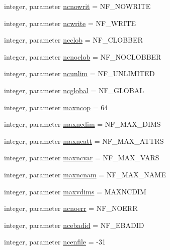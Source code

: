 \begin{DoxyCompactItemize}
\item 
integer, parameter \hyperlink{namespacenetcdf__nf__data_ad1e0a536032a056da8a53764f01f2a30}{ncnowrit} = N\+F\+\_\+\+N\+O\+W\+R\+I\+TE
\item 
integer, parameter \hyperlink{namespacenetcdf__nf__data_a8531d390a08862ce18bcb314168801cc}{ncwrite} = N\+F\+\_\+\+W\+R\+I\+TE
\item 
integer, parameter \hyperlink{namespacenetcdf__nf__data_a390b90425185669675d58dd9166deea1}{ncclob} = N\+F\+\_\+\+C\+L\+O\+B\+B\+ER
\item 
integer, parameter \hyperlink{namespacenetcdf__nf__data_af61770c9009f96909807d8a86849a191}{ncnoclob} = N\+F\+\_\+\+N\+O\+C\+L\+O\+B\+B\+ER
\item 
integer, parameter \hyperlink{namespacenetcdf__nf__data_af5632bf38434d6b35a1ffe750a5a74ec}{ncunlim} = N\+F\+\_\+\+U\+N\+L\+I\+M\+I\+T\+ED
\item 
integer, parameter \hyperlink{namespacenetcdf__nf__data_a9cc4e6ebfcd3becf1dcab3152fb47d28}{ncglobal} = N\+F\+\_\+\+G\+L\+O\+B\+AL
\item 
integer, parameter \hyperlink{namespacenetcdf__nf__data_a4095eb49dd5074dec84db1148a92c594}{maxncop} = 64
\item 
integer, parameter \hyperlink{namespacenetcdf__nf__data_af99c14cab35f6ca0ee15b37097449c02}{maxncdim} = N\+F\+\_\+\+M\+A\+X\+\_\+\+D\+I\+MS
\item 
integer, parameter \hyperlink{namespacenetcdf__nf__data_a316ad97cae409a49b989f1810a57b478}{maxncatt} = N\+F\+\_\+\+M\+A\+X\+\_\+\+A\+T\+T\+RS
\item 
integer, parameter \hyperlink{namespacenetcdf__nf__data_a8b7b8fa672979d04cbba61c44082ee90}{maxncvar} = N\+F\+\_\+\+M\+A\+X\+\_\+\+V\+A\+RS
\item 
integer, parameter \hyperlink{namespacenetcdf__nf__data_adcf62a4007872312900df1fd1fbffaa9}{maxncnam} = N\+F\+\_\+\+M\+A\+X\+\_\+\+N\+A\+ME
\item 
integer, parameter \hyperlink{namespacenetcdf__nf__data_af343b93b6e2963d388986795d5d71de5}{maxvdims} = M\+A\+X\+N\+C\+D\+IM
\item 
integer, parameter \hyperlink{namespacenetcdf__nf__data_a565c69bf6a7a8cf5736e86c239373273}{ncnoerr} = N\+F\+\_\+\+N\+O\+E\+RR
\item 
integer, parameter \hyperlink{namespacenetcdf__nf__data_afca989ca485a79e6842bb7a72cfc639f}{ncebadid} = N\+F\+\_\+\+E\+B\+A\+D\+ID
\item 
integer, parameter \hyperlink{namespacenetcdf__nf__data_a8df82c2d5df880f473778ae9ac3a5885}{ncenfile} = -\/31

\end{DoxyCompactItemize}
